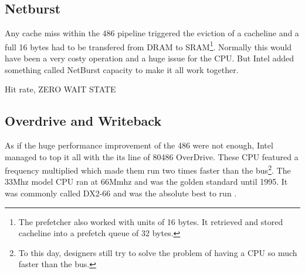 \subsection{Netburst}
Any cache miss within the 486 pipeline triggered the eviction of a cacheline and a full 16 bytes had to be transfered from DRAM to SRAM\footnote{The prefetcher also worked with units of 16 bytes. It retrieved and stored cacheline into a prefetch queue of 32 bytes.}. Normally this would have been a very costy operation and a huge issue for the CPU. But Intel added something called NetBurst capacity to make it all work together.\\
\par
Hit rate, ZERO WAIT STATE\\
\par
{}







\subsection{Overdrive and Writeback}
As if the huge performance improvement of the 486 were not enough, Intel managed to top it all with the its line of 80486 OverDrive. These CPU featured a frequency multiplied which made them run two times faster than the bus\footnote{To this day, designers still try to solve the problem of having a CPU so much faster than the bus.}. The 33Mhz model CPU ran at 66Mmhz and was the golden standard until 1995. It was commonly called DX2-66 and was the absolute best to run \doom.\\
\par 
{}
\par

